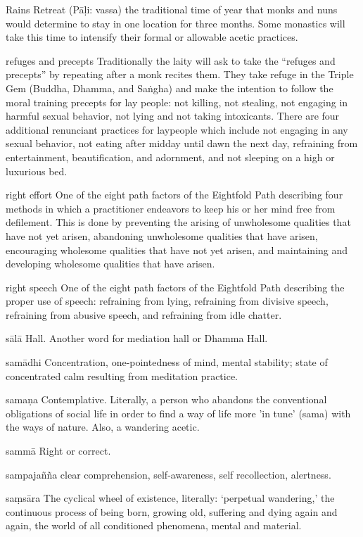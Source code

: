 Rains Retreat (Pāḷi: vassa) the traditional time of year that monks 
and nuns would determine to stay in one location for three months. Some 
monastics will take this time to intensify their formal or allowable 
acetic practices.

refuges and precepts Traditionally the laity will ask to take the 
``refuges and precepts'' by repeating after a monk recites them. They 
take refuge in the Triple Gem (Buddha, Dhamma, and Saṅgha) and make 
the intention to follow the moral training precepts for lay people: not 
killing, not stealing, not engaging in harmful sexual behavior, not 
lying and not taking intoxicants. There are four additional renunciant 
practices for laypeople which include not engaging in any sexual 
behavior, not eating after midday until dawn the next day, refraining 
from entertainment, beautification, and adornment, and not sleeping on 
a high or luxurious bed.

right effort One of the eight path factors of the Eightfold Path 
describing four methods in which a practitioner endeavors to keep his 
or her mind free from defilement. This is done by preventing the 
arising of unwholesome qualities that have not yet arisen, abandoning 
unwholesome qualities that have arisen, encouraging wholesome qualities 
that have not yet arisen, and maintaining and developing wholesome 
qualities that have arisen.

right speech One of the eight path factors of the Eightfold Path 
describing the proper use of speech: refraining from lying, refraining 
from divisive speech, refraining from abusive speech, and refraining 
from idle chatter.

sālā Hall. Another word for mediation hall or Dhamma Hall.

samādhi Concentration, one-pointedness of mind, mental stability; 
state of concentrated calm resulting from meditation practice.

samaṇa Contemplative. Literally, a person who abandons the 
conventional obligations of social life in order to find a way of life 
more 'in tune' (sama) with the ways of nature. Also, a wandering acetic.

sammā Right or correct.

sampajañña clear comprehension, self-awareness, self recollection, 
alertness.

saṃsāra The cyclical wheel of existence, literally: `perpetual 
wandering,' the continuous process of being born, growing old, 
suffering and dying again and again, the world of all conditioned 
phenomena, mental and material.

